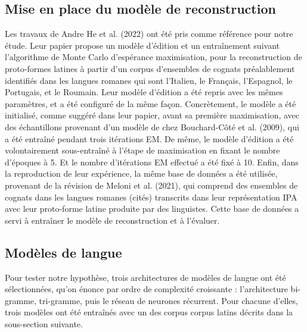 \documentclass[10pt, french]{article}
\begin{document}
\begin{multicols*}{2}
\subsection{Mise en place du modèle de reconstruction}
Les travaux de Andre He et al. (2022)\cite{andre} ont été pris comme référence pour notre étude. Leur papier propose un modèle d'édition et un entraînement suivant l'algorithme de Monte Carlo d'espérance maximisation, pour la reconstruction de proto-formes latines à partir d'un corpus d'ensembles de cognats préalablement identifiés dans les langues romanes qui sont l'Italien, le Français, l'Espagnol, le Portugais, et le Roumain. Leur modèle d'édition a été repris avec les mêmes paramètres, et a été configuré de la même façon. Concrètement, le modèle a été initialisé, comme suggéré dans leur papier, avant sa première maximisation, avec des échantillons provenant d'un modèle de chez Bouchard-Côté et al. (2009)\cite{bouchard}, qui a été entraîné pendant trois itérations EM. De même, le modèle d'édition a été volontairement sous-entraîné à l'étape de maximisation en fixant le nombre d'époques à 5. Et le nombre d'itérations EM effectué a été fixé à 10. Enfin, dans la reproduction de leur expérience, la même base de données a été utilisée, provenant de la révision de Meloni et al. (2021)\cite{meloni}, qui comprend des ensembles de cognats dans les langues romanes (cités) transcrits dans leur représentation IPA avec leur proto-forme latine produite par des linguistes. Cette base de données a servi à entraîner le modèle de reconstruction et à l'évaluer.

\subsection{Modèles de langue}
Pour tester notre hypothèse, trois architectures de modèles de langue ont été sélectionnées, 
qu'on énonce par ordre de complexité croissante : l'architecture bi-gramme, tri-gramme, puis 
le réseau de neurones récurrent. Pour chacune d'elles, trois modèles ont été entraînés avec un des corpus 
corpus latins décrits dans la sous-section suivante. 


\end{multicols*}
\end{document}
